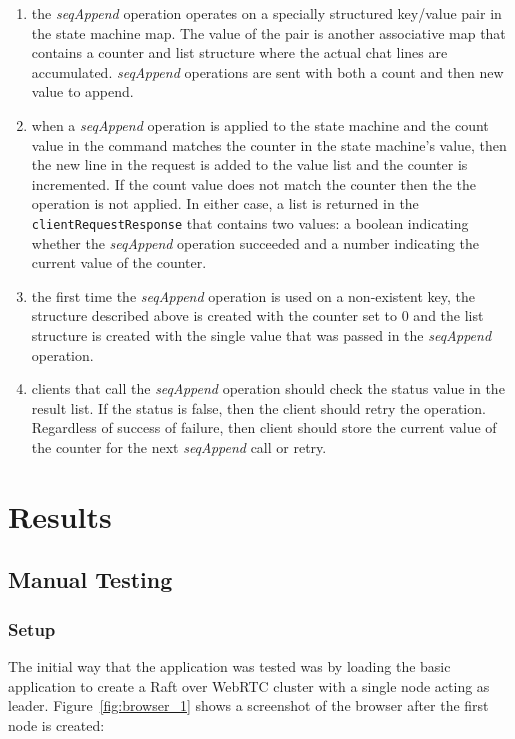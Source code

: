 \documentclass[conference,compsoc]{./IEEEtran/IEEEtran}
\begin{document}
\begin{enumerate}
\item the \emph{seqAppend} operation operates on a specially structured
    key/value pair in the state machine map. The value of the pair is
    another associative map that contains a counter and list structure
    where the actual chat lines are accumulated. \emph{seqAppend}
    operations are sent with both a count and then new value to
    append.
\item when a \emph{seqAppend} operation is applied to the state
    machine and the count value in the command matches the counter in
    the state machine's value, then the new line in the request is
    added to the value list and the counter is incremented. If the count
    value does not match the counter then the the operation is not
    applied. In either case, a list is returned in the
    \texttt{clientRequestResponse} that contains two values: a boolean
    indicating whether the \emph{seqAppend} operation succeeded and
    a number indicating the current value of the counter.
\item the first time the \emph{seqAppend} operation is used on a non-existent
    key, the structure described above is created with the counter set
    to 0 and the list structure is created with the single value that
    was passed in the \emph{seqAppend} operation.
\item clients that call the \emph{seqAppend} operation should check the
    status value in the result list. If the status is false, then the
    client should retry the operation. Regardless of success of
    failure, then client should store the current value of the counter
    for the next \emph{seqAppend} call or retry.
\end{enumerate}

\section{Results}


\ifdefined\OPTIONAL

\subsection{Manual Testing}

\subsubsection{Setup}

The initial way that the application was tested was by loading the
basic application to create a Raft over WebRTC cluster with a single
node acting as leader. Figure~\ref{fig:browser_1} shows a screenshot
of the browser after the first node is created:
\end{document}
